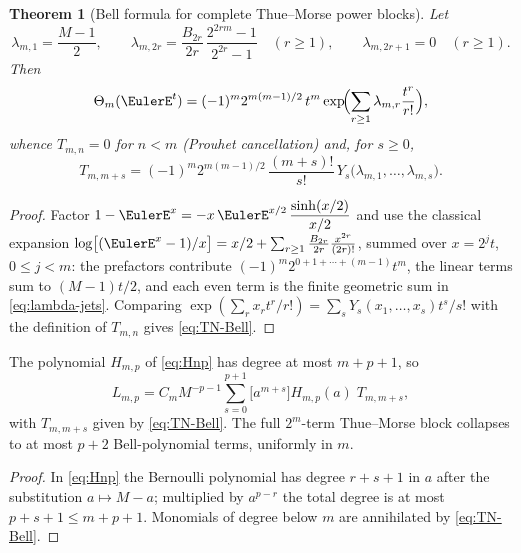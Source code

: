 \documentclass[11pt,oneside]{article}
\numberwithin{equation}{section}
\newtheorem{theorem}{Theorem}[section]
\theoremstyle{definition}
\theoremstyle{remark}
\newcommand{\Bell}{Y}
\newcommand{\ThetaTM}{\Theta}
\begin{document}
\begin{theorem}[Bell formula for complete Thue--Morse power blocks]
\label{thm:Bell-Prouhet}
Let
\begin{equation}
 \lambda_{m,1}=\frac{M-1}{2},
 \qquad
 \lambda_{m,2r}=\frac{B_{2r}}{2r}\,
 \frac{2^{2rm}-1}{2^{2r}-1}
 \quad(r\ge1),
 \qquad
 \lambda_{m,2r+1}=0\quad(r\ge1).
 \label{eq:lambda-jets}
\end{equation}
Then
\begin{equation}
 \ThetaTM_m(\EulerE^{t})
 =(-1)^{m}2^{m(m-1)/2}\,t^{m}
 \exp\!\Bigl(\sum_{r\ge1}\lambda_{m,r}\frac{t^{r}}{r!}\Bigr),
 \label{eq:theta-Bell-egf}
\end{equation}
whence $T_{m,n}=0$ for $n<m$ (Prouhet cancellation) and, for
$s\ge0$,
\begin{equation}
 \boxed{\;
 T_{m,m+s}=(-1)^{m}2^{m(m-1)/2}\,
 \frac{(m+s)!}{s!}\,
 \Bell_s\bigl(\lambda_{m,1},\dots,\lambda_{m,s}\bigr).
 \;}
 \label{eq:TN-Bell}
\end{equation}
\end{theorem}

\begin{proof}
Factor $1-\EulerE^{x}=-x\,\EulerE^{x/2}\,\dfrac{\sinh(x/2)}{x/2}$ and use the
classical expansion
$\log\bigl[(\EulerE^{x}-1)/x\bigr]
=x/2+\sum_{r\ge1}\frac{B_{2r}}{2r}\frac{x^{2r}}{(2r)!}$,
summed over $x=2^{j}t$, $0\le j<m$: the prefactors contribute
$(-1)^{m}2^{0+1+\cdots+(m-1)}t^{m}$, the linear terms sum to
$(M-1)t/2$, and each even term is the finite geometric sum in
\eqref{eq:lambda-jets}.  Comparing
$\exp(\sum_r x_rt^r/r!)=\sum_s\Bell_s(x_1,\dots,x_s)t^{s}/s!$ with the
definition of $T_{m,n}$ gives \eqref{eq:TN-Bell}.
\end{proof}

\begin{corollary}
\label{cor:pplus2}
The polynomial $H_{m,p}$ of \eqref{eq:Hnp} has degree at most
$m+p+1$, so
\begin{equation}
 \boxed{\;
 L_{m,p}=C_mM^{-p-1}
 \sum_{s=0}^{p+1}\bigl[a^{m+s}\bigr]H_{m,p}(a)\;T_{m,m+s},
 \;}
 \label{eq:Bell-collapse}
\end{equation}
with $T_{m,m+s}$ given by \eqref{eq:TN-Bell}.  The full
$2^{m}$-term Thue--Morse block collapses to at most $p+2$
Bell-polynomial terms, uniformly in $m$.
\end{corollary}

\begin{proof}
In \eqref{eq:Hnp} the Bernoulli polynomial has degree $r+s+1$ in $a$
after the substitution $a\mapsto M-a$; multiplied by $a^{p-r}$ the
total degree is at most $p+s+1\le m+p+1$.  Monomials of degree below
$m$ are annihilated by \eqref{eq:TN-Bell}.
\end{proof}
\end{document}
